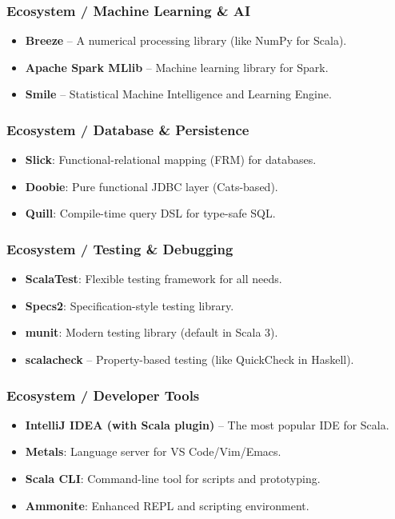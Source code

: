 \documentclass{beamer}
\begin{document}

\begin{frame}
\frametitle{Ecosystem / Machine Learning \& AI }
\begin{itemize}
  \item \textbf{Breeze} – A numerical processing library (like NumPy for Scala).
  \item \textbf{Apache Spark MLlib} – Machine learning library for Spark.
  \item \textbf{Smile} – Statistical Machine Intelligence and Learning Engine.
\end{itemize}
\end{frame}


\begin{frame}
\frametitle{Ecosystem / Database \& Persistence }
\begin{itemize}
  \item \textbf{Slick}: Functional-relational mapping (FRM) for databases.
  \item \textbf{Doobie}: Pure functional JDBC layer (Cats-based).
  \item \textbf{Quill}: Compile-time query DSL for type-safe SQL.
\end{itemize}
\end{frame}


\begin{frame}
\frametitle{Ecosystem /  Testing \& Debugging }
\begin{itemize}
  \item \textbf{ScalaTest}: Flexible testing framework for all needs.
  \item \textbf{Specs2}: Specification-style testing library.
  \item \textbf{munit}: Modern testing library (default in Scala 3).
  \item \textbf{scalacheck} – Property-based testing (like QuickCheck in Haskell).
\end{itemize}
\end{frame}


\begin{frame}
\frametitle{Ecosystem / Developer Tools }
 \begin{itemize}
  \item \textbf{IntelliJ IDEA (with Scala plugin)} – The most popular IDE for Scala.
  \item \textbf{Metals}: Language server for VS Code/Vim/Emacs.
  \item \textbf{Scala CLI}: Command-line tool for scripts and prototyping.
  \item \textbf{Ammonite}: Enhanced REPL and scripting environment.
\end{itemize}
\end{frame}
\end{document}
